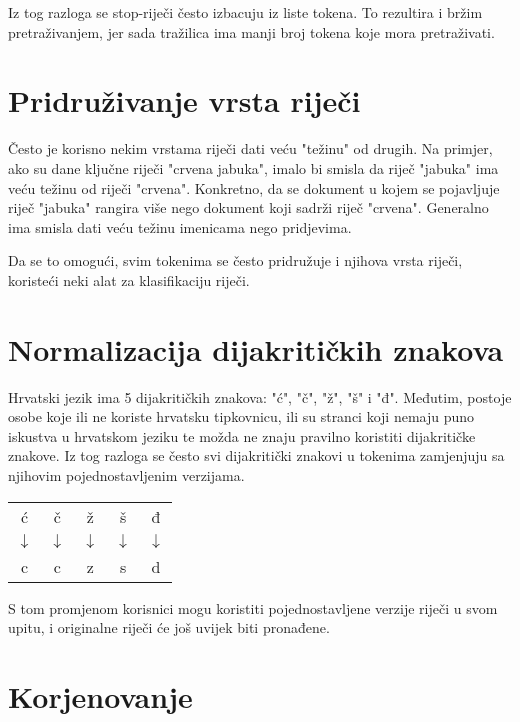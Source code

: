 \documentclass[11pt]{scrreprt}
\begin{document}
Iz tog razloga se stop-riječi često izbacuju iz liste tokena. To rezultira i bržim pretraživanjem, jer sada tražilica ima manji broj tokena koje mora pretraživati.

\section{Pridruživanje vrsta riječi}

Često je korisno nekim vrstama riječi dati veću "težinu" od drugih. Na primjer, ako su dane ključne riječi "crvena jabuka", imalo bi smisla da riječ "jabuka" ima veću težinu od riječi "crvena". Konkretno, da se dokument u kojem se pojavljuje riječ "jabuka" rangira više nego dokument koji sadrži riječ "crvena". Generalno ima smisla dati veću težinu imenicama nego pridjevima.

Da se to omogući, svim tokenima se često pridružuje i njihova vrsta riječi, koristeći neki alat za klasifikaciju riječi.

\section{Normalizacija dijakritičkih znakova}

Hrvatski jezik ima 5 dijakritičkih znakova: "ć", "č", "ž", "š" i "đ". Međutim, postoje osobe koje ili ne koriste hrvatsku tipkovnicu, ili su stranci koji nemaju puno iskustva u hrvatskom jeziku te možda ne znaju pravilno koristiti dijakritičke znakove. Iz tog razloga se često svi dijakritički znakovi u tokenima zamjenjuju sa njihovim pojednostavljenim verzijama.

\begin{center}
  \begin{tabular}{ccccc}
    ć            & č            & ž            & š            & đ            \\
    $\downarrow$ & $\downarrow$ & $\downarrow$ & $\downarrow$ & $\downarrow$ \\
    c            & c            & z            & s            & d            \\
  \end{tabular}
\end{center}

S tom promjenom korisnici mogu koristiti pojednostavljene verzije riječi u svom upitu, i originalne riječi će još uvijek biti pronađene.

\section{Korjenovanje}
\end{document}
